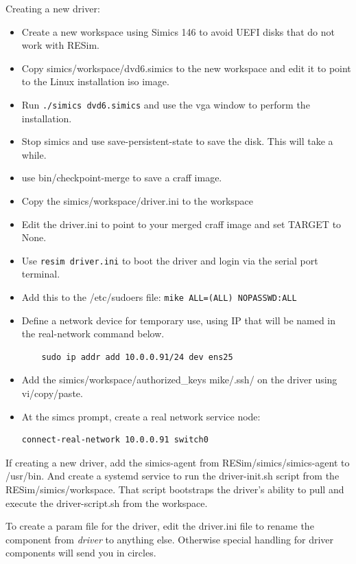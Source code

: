 \documentclass[titlepage]{article}
\begin{document}
\begin{appendices}
Creating a new driver:
\begin{itemize}
\item Create a new workspace using Simics 146 to avoid UEFI disks that do not work with RESim.
\item Copy simics/workspace/dvd6.simics to the new workspace and edit it to point to the Linux installation iso image.
\item Run {\tt ./simics dvd6.simics} and use the vga window to perform the installation.
\item Stop simics and use save-persistent-state to save the disk.  This will take a while.
\item use bin/checkpoint-merge to save a craff image.
\item Copy the simics/workspace/driver.ini to the workspace
\item Edit the driver.ini to point to your merged craff image and set TARGET to None.
\item Use {\tt resim driver.ini} to boot the driver and login via the serial port terminal.
\item Add this to the /etc/sudoers file: {\tt mike ALL=(ALL) NOPASSWD:ALL}
\item Define a network device for temporary use, using IP that will be named in the real-network command below.
\begin{verbatim}
    sudo ip addr add 10.0.0.91/24 dev ens25
\end{verbatim}
\item Add the simics/workspace/authorized\_keys mike/.ssh/ on the driver using vi/copy/paste.
\item At the simcs prompt, create a real network service node:
\begin{verbatim}
connect-real-network 10.0.0.91 switch0
\end{verbatim}
\end{itemize}
If creating a new driver, add the simics-agent from RESim/simics/simics-agent to /usr/bin.  And create a systemd service to run the
driver-init.sh script from the RESim/simics/workspace.  That script bootstraps the driver's ability to pull
and execute the driver-script.sh from the workspace.

To create a param file for the driver, edit the driver.ini file to rename the component from \textit{driver} to anything else.  Otherwise special handling for
driver components will send you in circles.


\end{appendices}
\end{document}
